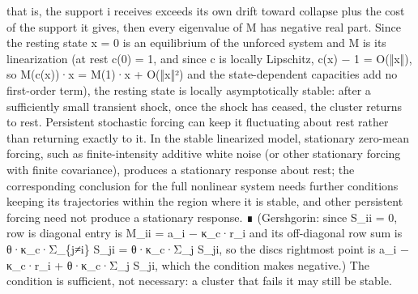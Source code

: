 \documentclass[
]{article}
\begin{document}
that is, the support i receives exceeds its own drift toward collapse
plus the cost of the support it gives, then every eigenvalue of M has
negative real part. Since the resting state x = 0 is an equilibrium of
the unforced system and M is its linearization (at rest c(0) = 1, and
since c is locally Lipschitz, c(x) − 1 = O(‖x‖), so M(c(x))·x = M(1)·x +
O(‖x‖²) and the state-dependent capacities add no first-order term), the
resting state is locally asymptotically stable: after a sufficiently
small transient shock, once the shock has ceased, the cluster returns to
rest. Persistent stochastic forcing can keep it fluctuating about rest
rather than returning exactly to it. In the stable linearized model,
stationary zero-mean forcing, such as finite-intensity additive white
noise (or other stationary forcing with finite covariance), produces a
stationary response about rest; the corresponding conclusion for the
full nonlinear system needs further conditions keeping its trajectories
within the region where it is stable, and other persistent forcing need
not produce a stationary response. ∎ (Gershgorin: since S\_ii = 0, row
i\textquotesingle s diagonal entry is M\_ii = a\_i − κ\_c·r\_i and its
off-diagonal row sum is θ·κ\_c·Σ\_\{j≠i\} S\_ji = θ·κ\_c·Σ\_j S\_ji, so
the disc\textquotesingle s rightmost point is a\_i − κ\_c·r\_i +
θ·κ\_c·Σ\_j S\_ji, which the condition makes negative.) The condition is
sufficient, not necessary: a cluster that fails it may still be stable.
\end{document}
